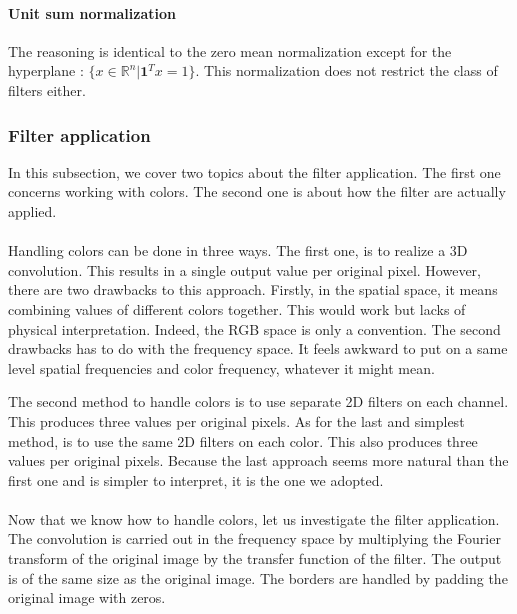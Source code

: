 \documentclass[a4paper]{report}
\begin{document}
			\paragraph{Unit sum normalization}
			The reasoning is identical to the zero mean normalization except for the hyperplane : $\{x \in \mathbb{R}^n | \textbf{1}^{T}x = 1\}$. This normalization does not restrict the class of filters either. 
			
			
			\subsubsection{Filter application}%
			In this subsection, we cover two topics about the filter application. The first one concerns working with colors. The second one is about how the filter are actually applied. 
			\paragraph{}
			Handling colors can be done in three ways. 
			The first one, is to realize a 3D convolution. This results in a single output value per original pixel. However, there are two drawbacks to this approach. Firstly, in the spatial space, it means combining values of different colors together. This would work but lacks of physical interpretation. Indeed, the RGB space is only a convention. The second drawbacks has to do with the frequency space. It feels awkward to put on a same level spatial frequencies and color frequency, whatever it might mean.
			\par
			The second method to handle colors is to use separate 2D filters on each channel. This produces three values per original pixels. As for the last and simplest method, is to use the same 2D filters on each color. This also produces three values per original pixels.
			Because the last approach seems more natural than the first one and is simpler to interpret, it is the one we adopted.
			\paragraph{}
			Now that we know how to handle colors, let us investigate the filter application.
			The convolution is carried out in the frequency space by multiplying the Fourier transform of the original image by the transfer function of the filter. The output is of the same size as the original image. The borders are handled by padding the original image with zeros.
			
\end{document}
